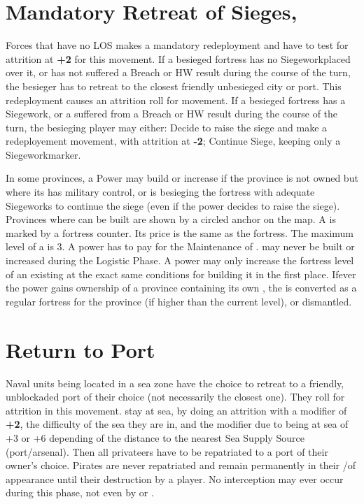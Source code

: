 \section{Mandatory Retreat of Sieges, \Presidios}\label{chRedep:Retreat, presidios}

 Forces that have no LOS makes a mandatory redeployment
and have to test for attrition at {\bf +2} for this movement.
If a besieged fortress has no Siegework\faceplus placed over it, or has not
suffered a Breach or HW result during the course of the turn, the besieger has
to retreat to the closest friendly unbesieged city or port. This redeployment
causes an attrition roll for movement.
If a besieged fortress has a Siegework\faceplus, or a suffered from a Breach
or HW result during the course of the turn, the besieging player may either:
\bparag Decide to raise the siege and make a redeployement movement, with
attrition at {\bf -2};
\bparag Continue Siege, keeping only a Siegework\facemoins marker.

\label{chRedep:BuildPresidios}
In some provinces, a Power may build or increase \Presidios if the province is
not owned but where its has military control, or is besieging the fortress
with adequate Siegeworks to continue the siege (even if the power decides to
raise the siege).
\bparag Provinces where \Presidios can be built are shown by a circled anchor
on the map.
\bparag A \Presidio is marked by a fortress counter. Its price is the same as
the fortress. The maximum level of a \Presidio is 3.  A power has to pay for
the Maintenance of \Presidio.  \Presidios may never be built or increased
during the Logistic Phase.
\bparag A power may only increase the fortress level of an existing \Presidios
at the exact same conditions for building it in the first place.
\bparag Ifever the power gains ownership of a province containing its own
\Presidio, the \Presidio is converted as a regular fortress for the province
(if higher than the current level), or dismantled.



\section{Return to Port}\label{chRedep:Return port}

\aparag Naval units being located in a sea zone have the choice to
\bparag retreat to a friendly, unblockaded port of their choice (not
necessarily the closest one). They roll for attrition in this movement.
\bparag stay at sea, by doing an attrition with a modifier of {\bf +2}, the
difficulty of the sea they are in, and the modifier due to being at sea of +3
or +6 depending of the distance to the nearest Sea Supply Source
(port/arsenal).
\aparag Then all privateers have to be repatriated to a port of their owner's
choice.
\aparag Pirates are never repatriated and remain permanently in their
\STZ/\CTZ of appearance until their destruction by a player.
\aparag No interception may ever occur during this phase, not even by
\Presidios or \StraitFort.



